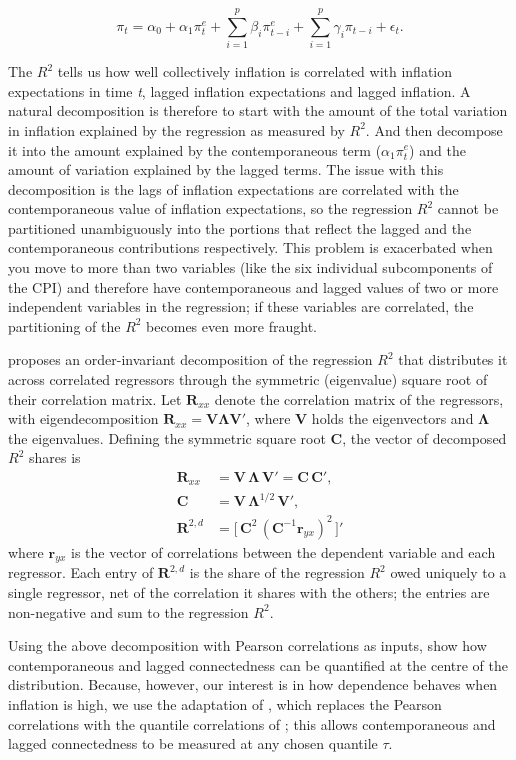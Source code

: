 \documentclass{article}
\begin{document}
\[
\pi_t
=
\alpha_0
+
\alpha_1 \pi_t^e
+
\sum_{i=1}^{p} \beta_i \pi_{t-i}^e
 +
 \sum_{i=1}^{p} \gamma_i \pi_{t-i}
+
\epsilon_t.
\]

The $R^2$ tells us how well collectively inflation is correlated with inflation expectations in time \textit{t}, lagged inflation expectations  and lagged inflation. A natural decomposition is therefore to start with the amount of the total variation in inflation explained by the regression as measured by $R^2$. And then decompose it into the amount explained by the contemporaneous term ($\alpha_1 \pi_t^e$) and the amount of variation explained by the lagged terms. The issue with this decomposition is the lags of inflation expectations are correlated with the contemporaneous value of inflation expectations,  so the regression $R^2$ cannot be partitioned unambiguously into the portions that reflect the lagged and the contemporaneous contributions respectively.  This problem is exacerbated when you move to more than two variables (like the six individual subcomponents of the CPI) and therefore have contemporaneous and lagged values of two or more independent variables in the regression; if these variables are correlated, the partitioning of the $R^2$ becomes even more fraught.


\textcite{genizi1993} proposes an order-invariant decomposition of the regression
$R^2$ that distributes it across correlated regressors through the symmetric
(eigenvalue) square root of their correlation matrix. Let $\bm{R}_{xx}$ denote
the correlation matrix of the regressors, with eigendecomposition
$\bm{R}_{xx}=\bm{V}\bm{\Lambda}\bm{V}'$, where $\bm{V}$ holds the eigenvectors and
$\bm{\Lambda}$ the eigenvalues. Defining the symmetric square root $\bm{C}$, the
vector of decomposed $R^2$ shares is
\begin{align}
\bm{R}_{xx} &= \bm{V}\,\bm{\Lambda}\,\bm{V}' = \bm{C}\,\bm{C}', \label{eq:rxx}\\
\bm{C}      &= \bm{V}\,\bm{\Lambda}^{1/2}\,\bm{V}', \label{eq:C}\\
\bm{R}^{2,d} &= \bigl[\,\bm{C}^2\,(\bm{C}^{-1}\bm{r}_{yx})^2\,\bigr]' 
  \label{eq:r2d}
\end{align}
where $\bm{r}_{yx}$ is the vector of correlations between the dependent variable
and each regressor. Each entry of $\bm{R}^{2,d}$ is the share of the regression $R^2$ owed
uniquely to a single regressor, net of the correlation it shares with the others; the entries are
non-negative and sum to the regression $R^2$.

 Using the above decomposition with Pearson correlations as inputs, \textcite{balli2023} show how contemporaneous and lagged connectedness can be quantified at the centre of the distribution. Because, however, our interest is in how dependence behaves when inflation is high, we use the adaptation of \textcite{shahzadetal}, which replaces the Pearson correlations with the quantile correlations of \textcite{choishin2022}; this allows contemporaneous and lagged connectedness to be measured at any chosen quantile $\tau$.
\end{document}
